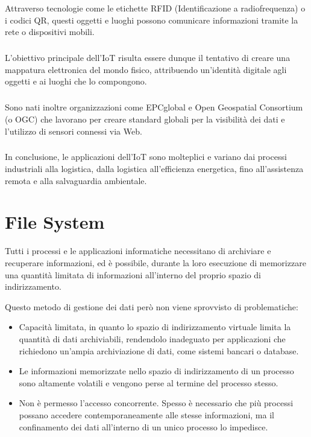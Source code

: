 \documentclass[12pt,a4paper,openright,twoside]{book}
\begin{document}
        Attraverso tecnologie come le etichette RFID (Identificazione a radiofrequenza) o i codici QR, questi oggetti e luoghi possono comunicare informazioni tramite la rete o dispositivi mobili.

        \subparagraph*{}

        L'obiettivo principale dell’\ac{IoT} risulta essere dunque il tentativo di creare una mappatura elettronica del mondo fisico, attribuendo un’identità digitale agli oggetti e ai luoghi che lo compongono.

        \subparagraph*{}

        Sono nati inoltre organizzazioni come EPCglobal e Open Geospatial Consortium (o OGC) che lavorano per creare standard globali per la visibilità dei dati e l’utilizzo di sensori connessi via Web.

        \subparagraph*{}

        In conclusione, le applicazioni dell’\ac{IoT} sono molteplici e variano dai processi industriali alla logistica, dalla logistica all’efficienza energetica, fino all’assistenza remota e alla salvaguardia ambientale.

        \cite{uckelmann2011architecting}\cite{hersent2011internet}\cite{chaouchi2013internet}

    \section{File System}

        Tutti i processi e le applicazioni informatiche necessitano di archiviare e recuperare informazioni, ed è possibile, durante la loro esecuzione di memorizzare una quantità limitata di informazioni all'interno del proprio spazio di indirizzamento.

        Questo metodo di gestione dei dati però non viene sprovvisto di problematiche:

        \begin{itemize}
            \item Capacità limitata, in quanto lo spazio di indirizzamento virtuale limita la quantità di dati archiviabili, rendendolo inadeguato per applicazioni che richiedono un'ampia archiviazione di dati, come sistemi bancari o database.
            \item Le informazioni memorizzate nello spazio di indirizzamento di un processo sono altamente volatili e vengono perse al termine del processo stesso.
            \item Non è permesso l'accesso concorrente. Spesso è necessario che più processi possano accedere contemporaneamente alle stesse informazioni, ma il confinamento dei dati all'interno di un unico processo lo impedisce.
        \end{itemize}
\end{document}
